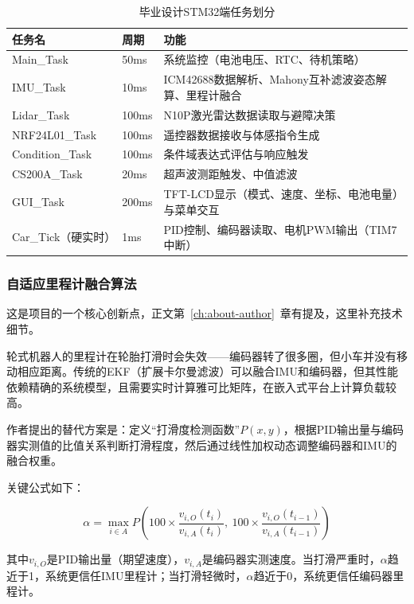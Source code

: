 \begin{table}[htbp]
	\centering
	\caption{毕业设计STM32端任务划分}
	\label{tab:app-graduation-tasks}
	\begin{tabular}{lll}
		\toprule
		任务名 & 周期 & 功能 \\
		\midrule
		Main\_Task & 50ms & 系统监控（电池电压、RTC、待机策略） \\
		IMU\_Task & 10ms & ICM42688数据解析、Mahony互补滤波姿态解算、里程计融合 \\
		Lidar\_Task & 100ms & N10P激光雷达数据读取与避障决策 \\
		NRF24L01\_Task & 100ms & 遥控器数据接收与体感指令生成 \\
		Condition\_Task & 100ms & 条件域表达式评估与响应触发 \\
		CS200A\_Task & 20ms & 超声波测距触发、中值滤波 \\
		GUI\_Task & 200ms & TFT-LCD显示（模式、速度、坐标、电池电量）与菜单交互 \\
		Car\_Tick（硬实时） & 1ms & PID控制、编码器读取、电机PWM输出（TIM7中断） \\
		\bottomrule
	\end{tabular}
\end{table}

\subsubsection{自适应里程计融合算法}

这是项目的一个核心创新点，正文第~\ref{ch:about-author}~章有提及，这里补充技术细节。

轮式机器人的里程计在轮胎打滑时会失效——编码器转了很多圈，但小车并没有移动相应距离。传统的EKF（扩展卡尔曼滤波）可以融合IMU和编码器，但其性能依赖精确的系统模型，且需要实时计算雅可比矩阵，在嵌入式平台上计算负载较高。

作者提出的替代方案是：定义“打滑度检测函数”\(P(x,y)\)，根据PID输出量与编码器实测值的比值关系判断打滑程度，然后通过线性加权动态调整编码器和IMU的融合权重。

关键公式如下：

\begin{equation}
	\alpha = \max_{i \in A} P\left(100 \times \frac{v_{i,O}(t_i)}{v_{i,A}(t_i)},\ 100 \times \frac{v_{i,O}(t_{i-1})}{v_{i,A}(t_{i-1})}\right)
\end{equation}

其中\(v_{i,O}\)是PID输出量（期望速度），\(v_{i,A}\)是编码器实测速度。当打滑严重时，\(\alpha\)趋近于1，系统更信任IMU里程计；当打滑轻微时，\(\alpha\)趋近于0，系统更信任编码器里程计。

